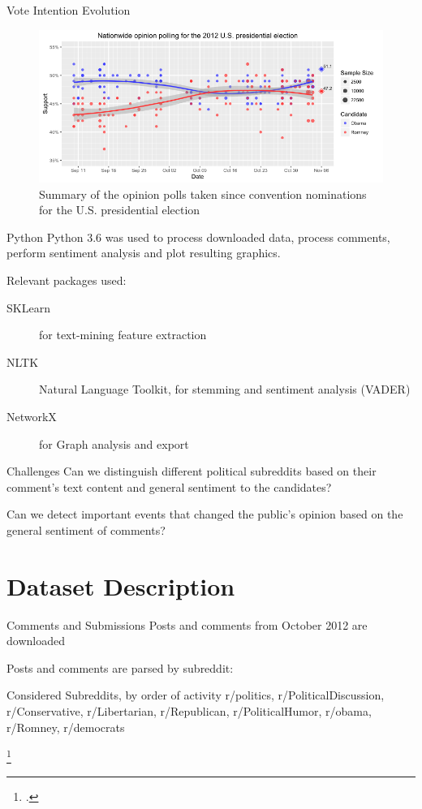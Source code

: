 \documentclass[aspectratio=169,notes]{beamer}
\begin{document}
\begin{frame}{Vote Intention Evolution}
 \begin{figure}[p]
 \centering
 \includegraphics[width=\linewidth]{time_intention.png}
 \captionsetup{justification=centering}
 \caption{Summary of the opinion polls taken since convention nominations for the U.S. presidential election}
\end{figure}
\end{frame}

\begin{frame}{Python}
 \alert{Python 3.6} was used to process downloaded data, process comments, perform sentiment analysis and plot resulting graphics.
 
 Relevant packages used:
 \begin{description}
  \item[SKLearn] for text-mining feature extraction
  \item[NLTK] Natural Language Toolkit, for stemming and sentiment analysis (VADER)
  \item[NetworkX] for Graph analysis and export
 \end{description}
\end{frame}

\begin{frame}{Challenges}
 Can we distinguish different political \alert{subreddits} based on their \alert{comment's text} content and general \alert{sentiment} to the candidates?\pause
 
 Can we detect important \alert{events} that changed the public's opinion based on the general \alert{sentiment} of comments?
\end{frame}

\section{Dataset Description}

\begin{frame}{Comments and Submissions}
 Posts and comments from October 2012 are downloaded\footnotemark
 
 Posts and comments are parsed by subreddit:
 
 \begin{block}{Considered Subreddits, by order of activity}
  r/politics, 
  r/PoliticalDiscussion, 
  r/Conservative, 
  r/Libertarian, 
  r/Republican, 
  r/PoliticalHumor, 
  r/obama, 
  r/Romney, 
  r/democrats
 \end{block}
\footcitetext{reddit_download}
\end{frame}
\end{document}
